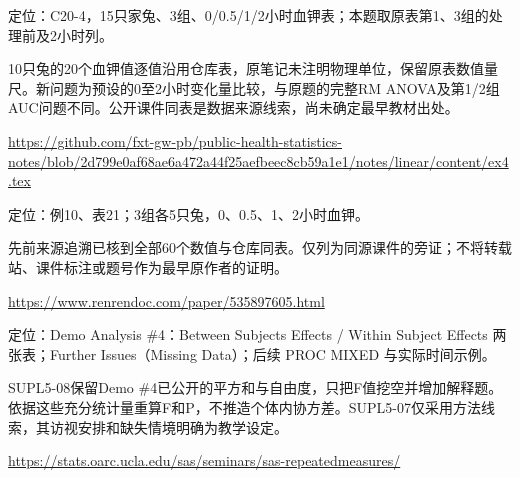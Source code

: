 \par\noindent\begin{minipage}{\linewidth}\label{src:L5-RABBIT}
\par
定位：C20-4，15只家兔、3组、0/0.5/1/2小时血钾表；本题取原表第1、3组的处理前及2小时列。\par
10只兔的20个血钾值逐值沿用仓库表，原笔记未注明物理单位，保留原表数值量尺。新问题为预设的0至2小时变化量比较，与原题的完整RM ANOVA及第1/2组AUC问题不同。公开课件同表是数据来源线索，尚未确定最早教材出处。\par
{\small\url{https://github.com/fxt-gw-pb/public-health-statistics-notes/blob/2d799e0af68ae6a472a44f25aefbeec8cb59a1e1/notes/linear/content/ex4.tex}}\par
\end{minipage}\par\medskip

\par\noindent\begin{minipage}{\linewidth}\label{src:L5-RABBIT-TRACE}
\par
定位：例10、表21；3组各5只兔，0、0.5、1、2小时血钾。\par
先前来源追溯已核到全部60个数值与仓库同表。仅列为同源课件的旁证；不将转载站、课件标注或题号作为最早原作者的证明。\par
{\small\url{https://www.renrendoc.com/paper/535897605.html}}\par
\end{minipage}\par\medskip

\par\noindent\begin{minipage}{\linewidth}\label{src:L5-UCLA-SAS}
\par
定位：Demo Analysis \#4：Between Subjects Effects / Within Subject Effects 两张表；Further Issues（Missing Data）；后续 PROC MIXED 与实际时间示例。\par
SUPL5-08保留Demo \#4已公开的平方和与自由度，只把F值挖空并增加解释题。依据这些充分统计量重算F和P，不推造个体内协方差。SUPL5-07仅采用方法线索，其访视安排和缺失情境明确为教学设定。\par
{\small\url{https://stats.oarc.ucla.edu/sas/seminars/sas-repeatedmeasures/}}\par
\end{minipage}\par\medskip


